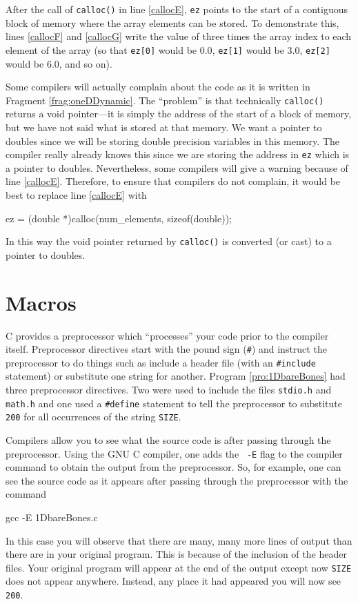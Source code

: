 After the call of {\tt calloc()} in line \ref{callocE}, {\tt ez}
points to the start of a contiguous block of memory where the array
elements can be stored.  To demonstrate this, lines \ref{callocF} and
\ref{callocG} write the value of three times the array index to each
element of the array (so that {\tt ez[0]} would be $0.0$, {\tt ez[1]}
would be $3.0$, {\tt ez[2]} would be $6.0$, and so on).

Some compilers will actually complain about the code as it is written
in Fragment \ref{frag:oneDDynamic}.  The ``problem'' is that
technically {\tt calloc()} returns a void pointer---it is simply the
address of the start of a block of memory, but we have not said what is
stored at that memory.  We want a pointer to doubles since we will be
storing double precision variables in this memory.  The compiler
really already knows this since we are storing the address in {\tt ez}
which is a pointer to doubles.  Nevertheless, some compilers will give
a warning because of line \ref{callocE}.  Therefore, to ensure that
compilers do not complain, it would be best to replace line
\ref{callocE} with
\begin{code}
  ez = (double *)calloc(num_elements, sizeof(double));
\end{code}
In this way the void pointer returned by {\tt calloc()} is converted
(or cast) to a pointer to doubles.

\section{Macros \label{sec:macros}}

C provides a preprocessor which ``processes'' your code prior to the
compiler itself.  Preprocessor directives start with the pound sign
({\tt \#}) and instruct the preprocessor to do things such as
include a header file (with an {\tt \#include} statement) or
substitute one string for another.  Program \ref{pro:1DbareBones}
had three preprocessor directives.  Two were used to include the files
{\tt stdio.h} and {\tt math.h} and one used a {\tt \#define} statement
to tell the preprocessor to substitute {\tt 200} for all occurrences
of the string {\tt SIZE}.

Compilers allow you to see what the source code is after passing
through the preprocessor.  Using the GNU C compiler, one adds the {\tt
-E} flag to the compiler command to obtain the output from the
preprocessor.  So, for example, one can see the source code as it
appears after passing through the preprocessor with the command
\begin{code}
  gcc -E 1DbareBones.c
\end{code}
In this case you will observe that there are many, many more lines of
output than there are in your original program.  This is because of
the inclusion of the header files.  Your original program will appear
at the end of the output except now {\tt SIZE} does not appear
anywhere.  Instead, any place it had appeared you will now see {\tt
200}.

